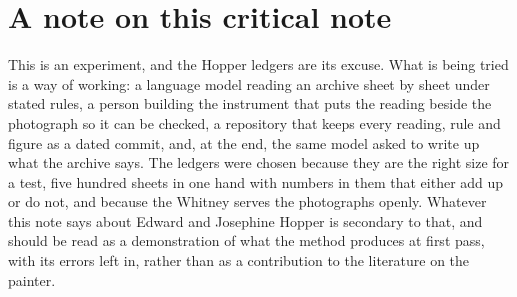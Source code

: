 \chapter*{A note on this critical note}

This is an experiment, and the Hopper ledgers are its excuse. What is being tried is a way of working: a language model reading an archive sheet by sheet under stated rules, a person building the instrument that puts the reading beside the photograph so it can be checked, a repository that keeps every reading, rule and figure as a dated commit, and, at the end, the same model asked to write up what the archive says. The ledgers were chosen because they are the right size for a test, five hundred sheets in one hand with numbers in them that either add up or do not, and because the Whitney serves the photographs openly. Whatever this note says about Edward and Josephine Hopper is secondary to that, and should be read as a demonstration of what the method produces at first pass, with its errors left in, rather than as a contribution to the literature on the painter.

